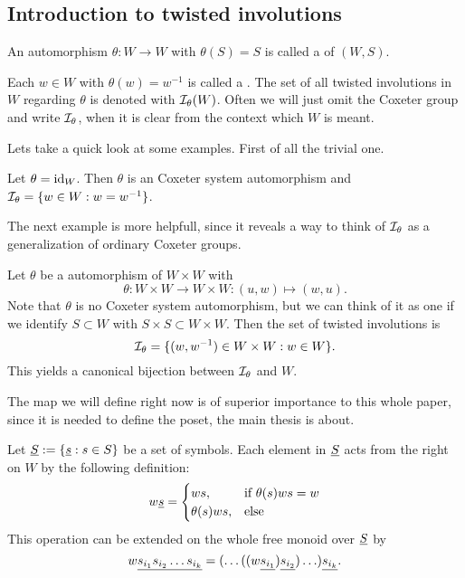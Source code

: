 \subsection{Introduction to twisted involutions}
\label{sec:twisted-involutions-introduction}

\begin{defi}
	An automorphism $\theta : W \to W$ with $\theta(S) = S$ is called a  of $(W,S)$.
\end{defi}

\begin{defi}
	Each $w \in W$ with $\theta(w) = w^{-1}$ is called a . The set of all twisted involutions in $W$ regarding $\theta$ is denoted with $\mathcal{I}_{\theta}(W)$. Often we will just omit the Coxeter group and write $\mathcal{I}_{\theta}$, when it is clear from the context which $W$ is meant.
\end{defi}

Lets take a quick look at some examples. First of all the trivial one.

\begin{exam}
	Let $\theta = \operatorname{id}_W$. Then $\theta$ is an Coxeter system automorphism and $\mathcal{I}_{\theta} = \{ w \in W : w = w^{-1} \}$.
\end{exam}

The next example is more helpfull, since it reveals a way to think of $\mathcal{I}_{\theta}$ as a generalization of ordinary Coxeter groups.

\begin{exam}
	Let $\theta$ be a automorphism of $W \times W$ with
	$$ \theta : W \times W \to W \times W : (u,w) \mapsto (w,u). $$
	Note that $\theta$ is no Coxeter system automorphism, but we can think of it as one if we identify $S \subset W$ with $S \times S \subset W \times W$.
	Then the set of twisted involutions is
	$$ \mathcal{I}_{\theta} = \{ (w,w^{-1}) \in W \times W : w \in W \}. $$
	This yields a canonical bijection between $\mathcal{I}_{\theta}$ and $W$.
\end{exam}

The map we will define right now is of superior importance to this whole paper, since it is needed to define the poset, the main thesis is about.

\begin{defi}
	Let $\underline{S} := \{ \underline{s} : s \in S \}$ be a set of symbols. Each element in $\underline{S}$ acts from the right on $W$ by the following definition:
	$$ w \underline{s} = \begin{cases}
		ws, & \textrm{if } \theta(s)ws = w \\
		\theta(s)ws, & \textrm{else} \\
	\end{cases} $$
	This operation can be extended on the whole free monoid over $\underline{S}$ by
	$$ w \underline{s_{i_1} s_{i_2} \ldots s_{i_k}} = (\ldots ((w \underline{s_{i_1}}) \underline{s_{i_2}}) \ldots) \underline{s_{i_k}}. $$
\end{defi}

